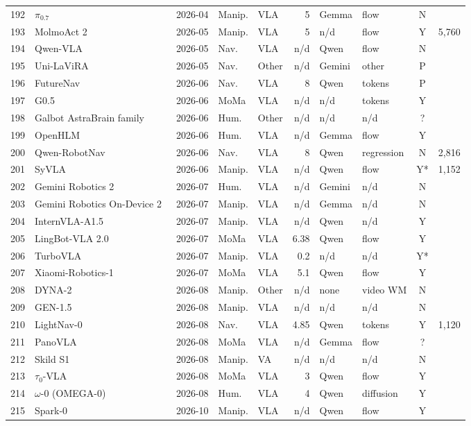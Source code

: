 \begin{longtable}{@{}r p{3.55cm} l l l r l l c r@{}}
192 & $\pi_{0.7}$~\cite{ax260415483} & 2026-04 & Manip. & VLA & 5 & Gemma & flow & N & \\
193 & MolmoAct 2~\cite{ax260502881} & 2026-05 & Manip. & VLA & 5 & n/d & flow & Y & 5,760\\
194 & Qwen-VLA~\cite{ax260530280} & 2026-05 & Nav. & VLA & n/d & Qwen & flow & N & \\
195 & Uni-LaViRA~\cite{ax260527582} & 2026-05 & Nav. & Other & n/d & Gemini & other & P & \\
196 & FutureNav~\cite{ax260630367} & 2026-06 & Nav. & VLA & 8 & Qwen & tokens & P & \\
197 & G0.5~\cite{ax260811739} & 2026-06 & MoMa & VLA & n/d & n/d & tokens & Y & \\
198 & Galbot AstraBrain family~\cite{web-galbot-astrabrain} & 2026-06 & Hum. & Other & n/d & n/d & n/d & ? & \\
199 & OpenHLM~\cite{ax260622174} & 2026-06 & Hum. & VLA & n/d & Gemma & flow & Y & \\
200 & Qwen-RobotNav~\cite{ax260618112} & 2026-06 & Nav. & VLA & 8 & Qwen & regression & N & 2,816\\
201 & SyVLA~\cite{ax260609009} & 2026-06 & Manip. & VLA & n/d & Qwen & flow & Y* & 1,152\\
202 & Gemini Robotics 2~\cite{web-gemini-robotics-2} & 2026-07 & Hum. & VLA & n/d & Gemini & n/d & N & \\
203 & Gemini Robotics On-Device 2~\cite{web-gemini-robotics-on-device-2} & 2026-07 & Manip. & VLA & n/d & Gemma & n/d & N & \\
204 & InternVLA-A1.5~\cite{ax260704988} & 2026-07 & Manip. & VLA & n/d & Qwen & n/d & Y & \\
205 & LingBot-VLA 2.0~\cite{ax260706403} & 2026-07 & MoMa & VLA & 6.38 & Qwen & flow & Y & \\
206 & TurboVLA~\cite{ax260727205} & 2026-07 & Manip. & VLA & 0.2 & n/d & n/d & Y* & \\
207 & Xiaomi-Robotics-1~\cite{ax260715330} & 2026-07 & MoMa & VLA & 5.1 & Qwen & flow & Y & \\
208 & DYNA-2~\cite{web-dyna-2} & 2026-08 & Manip. & Other & n/d & none & video WM & N & \\
209 & GEN-1.5~\cite{web-gen-1-5} & 2026-08 & Manip. & VLA & n/d & n/d & n/d & N & \\
210 & LightNav-0~\cite{ax260830935} & 2026-08 & Nav. & VLA & 4.85 & Qwen & tokens & Y & 1,120\\
211 & PanoVLA~\cite{ax260802257} & 2026-08 & MoMa & VLA & n/d & Gemma & flow & ? & \\
212 & Skild S1~\cite{web-skild-s1} & 2026-08 & Manip. & VA & n/d & n/d & n/d & N & \\
213 & $\tau_0$-VLA~\cite{ax260816885} & 2026-08 & MoMa & VLA & 3 & Qwen & flow & Y & \\
214 & $\omega$-0 (OMEGA-0)~\cite{ax260806375} & 2026-08 & Hum. & VLA & 4 & Qwen & diffusion & Y & \\
215 & Spark-0~\cite{ax261022342} & 2026-10 & Manip. & VLA & n/d & Qwen & flow & Y & \\
\end{longtable}
